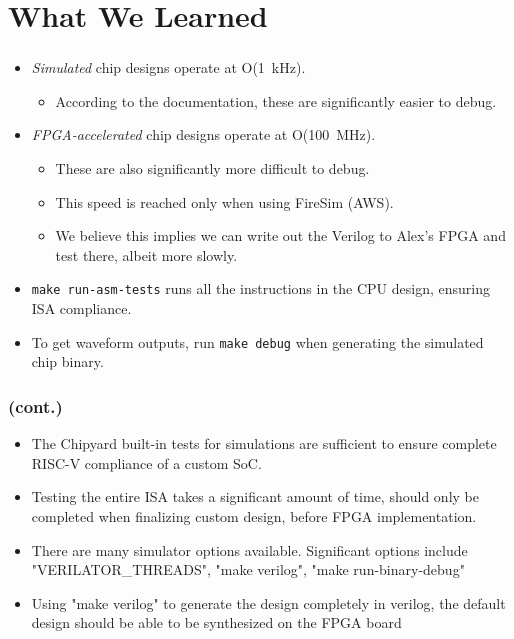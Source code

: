 \documentclass{../weeklyslides}
\begin{document}
\section{What We Learned}\label{sec:What_We_Learned}
\begin{frame}
  \frametitle{}
  \begin{itemize}
  \item \emph{Simulated} chip designs operate at O(\SI{1}{\kilo\hertz}).
    \begin{itemize}
    \item According to the documentation, these are significantly easier to debug.
    \end{itemize}
  \item \emph{FPGA-accelerated} chip designs operate at O(\SI{100}{\mega\hertz}).
    \begin{itemize}
    \item These are also significantly more difficult to debug.
    \item This speed is reached only when using FireSim (AWS).
    \item We believe this implies we can write out the Verilog to Alex's FPGA and test there, albeit more slowly.
    \end{itemize}
  \item \texttt{make run-asm-tests} runs all the instructions in the CPU design, ensuring ISA compliance.
  \item To get waveform outputs, run \texttt{make debug} when generating the simulated chip binary.
  \end{itemize}
\end{frame}
\begin{frame}
	\frametitle{ (cont.)}
	\begin{itemize}
		\item The Chipyard built-in tests for simulations are sufficient to ensure complete RISC-V compliance of a custom SoC.
		\item Testing the entire ISA takes a significant amount of time, should only be completed when finalizing custom design, before FPGA implementation.
		\item There are many simulator options available. Significant options include "VERILATOR\_THREADS", "make verilog", "make run-binary-debug"
		\item Using "make verilog" to generate the design completely in verilog, the default design should be able to be synthesized on the FPGA board
		
	\end{itemize}

\end{frame}
\end{document}
